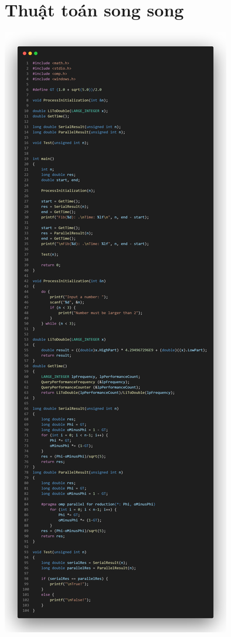 \documentclass[12pt,a4paper]{report}
\begin{document}
\section{Thuật toán song song}
\begin{center}
	\includegraphics[trim=0in 45in 0in 0in, clip, scale=0.25]{./Photos/Fibonacci/Parallel.PNG}

\end{center}
\end{document}
